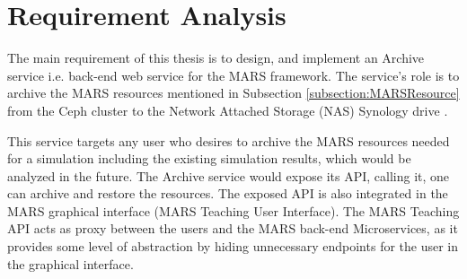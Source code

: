 \newpage
\chapter{Requirement Analysis}
\label{chap:ReqAnalysis}
 The main requirement of this thesis is to design, and implement an Archive service i.e. back-end web service for the MARS framework. The service's role is to
 archive the MARS resources mentioned in Subsection \ref{subsection:MARSResource} from the Ceph cluster \cite{Ceph} to the 
 Network Attached Storage (NAS) Synology drive \cite{Synology}.

 This service targets any user who desires to archive the MARS resources needed for a simulation including the existing simulation results, which would
 be analyzed in the future. The Archive service would expose its API, calling it, one can archive and restore the resources. The exposed
 API is also integrated in the MARS graphical interface (MARS Teaching User Interface). The MARS Teaching API acts as proxy between the users 
 and the MARS back-end Microservices, as it provides some level of abstraction by hiding unnecessary endpoints for the user in the graphical interface.



